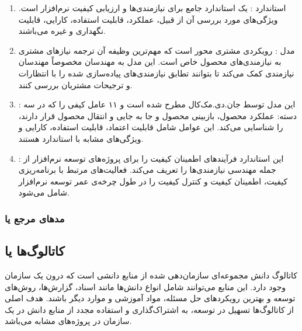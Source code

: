 \begin{enumerate}
    \item استاندارد : یک استاندارد جامع برای
    نیازمندی‌ها و ارزیابی کیفیت نرم‌افزار است. ویژگی‌های مورد بررسی آن از قبیل،
    عملکرد، قابلیت استفاده، کارایی، قابلیت نگهداری و غیره می‌باشند.
    \item مدل : رویکردی مشتری محور است که
    مهم‌ترین وظیفه آن ترجمه نیاز‌های مشتری به نیازمندی‌های محصول خاص است. این
    مدل به مهندسان مخصوصاً مهندسان نیازمندی کمک می‌کند تا بتوانند تطابق
    نیازمندی‌های پیاده‌سازی شده را با انتظارات و ترجیحات مشتریان بررسی کنند.
    \item {}: این مدل توسط جان.دی.مک‌کال مطرح شده است و
    ۱۱ عامل کیفی را که در سه دسته: عملکرد محصول، بازبینی محصول و جا به جایی و
    انتقال محصول قرار دارند، را شناسایی می‌کند. این عوامل شامل قابلیت اعتماد،
    قابلیت استفاده، کارایی و ویژگی‌های مشابه با استاندارد  هستند.
    \item {}: این استاندارد فرآیند‌های اطمینان کیفیت را برای
    پروژه‌های توسعه نرم‌افزار از جمله مهندسی نیازمندی‌ها را تعریف می‌کند.
    فعالیت‌های مرتبط با برنامه‌ریزی کیفیت، اطمینان کیفیت و کنترل کیفیت را در طول
    چرخه‌ی عمر توسعه نرم‌افزار شامل می‌شود.
\end{enumerate}

\subsubsection{مد‌های مرجع یا }

\subsection{کاتالوگ‌ها یا }

کاتالوگ دانش مجموعه‌ای سازمان‌دهی شده از منابع دانشی است که درون یک سازمان وجود
دارد. این منابع می‌توانند شامل انواع دانش‌ها مانند اسناد، گزارش‌ها، روش‌های
توسعه و بهترین رویکرد‌های حل مسئله، مواد آموزشی و موارد دیگر باشند. هدف اصلی از
کاتالوگ‌ها تسهیل در توسعه، به اشتراک‌گذاری و استفاده مجدد از منابع دانش در یک
سازمان در پروژه‌های مشابه می‌باشد.
